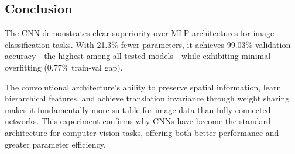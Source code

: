 \subsection{Conclusion}

The CNN demonstrates clear superiority over MLP architectures for image classification tasks. With 21.3\% fewer parameters, it achieves 99.03\% validation accuracy---the highest among all tested models---while exhibiting minimal overfitting (0.77\% train-val gap). 

The convolutional architecture's ability to preserve spatial information, learn hierarchical features, and achieve translation invariance through weight sharing makes it fundamentally more suitable for image data than fully-connected networks. This experiment confirms why CNNs have become the standard architecture for computer vision tasks, offering both better performance and greater parameter efficiency.